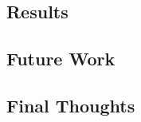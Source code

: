 
\subsection{Results}
\label{sec:results}

\subsection{Future Work}
\label{sec:future-work}


\subsection{Final Thoughts}
\label{sec:final-thoughts}


